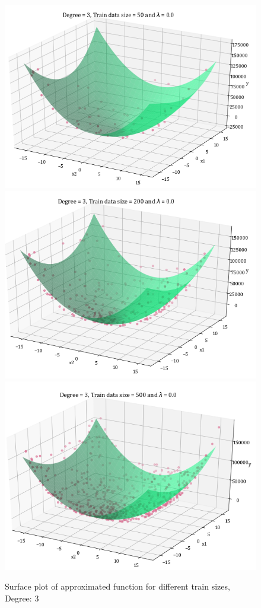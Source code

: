\documentclass[12pt,a4paper]{article}
\begin{document}
\begin{figure}[H]
    \centering
    \includegraphics[scale=0.6]{images/D=3,T=50,l=0.0.png}
    \hspace{2em}
    \includegraphics[scale=0.6]{images/D=3,T=200,l=0.0.png}
    \includegraphics[scale=0.6]{images/D=3,T=500,l=0.0.png}
    \caption{Surface plot of approximated function for different train sizes, Degree: 3}
    \label{fig:sp_d3}
\end{figure}
\end{document}
